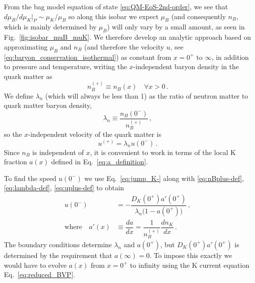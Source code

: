 \documentclass[10pt,superscriptaddress,
amsmath,aps,prc,twocolumn,nofootinbib,floatfix]{revtex4-1}
\newcommand{\Bratio}{\lambda_n}
\begin{document}
From the bag model equation of state \eqref{eq:QM-EoS-2nd-order}, we see that $d\mu_B/d\mu_K|_P\sim \mu_K/\mu_B$ so along this isobar we expect $\mu_B$ (and consequently $n_B$, which is mainly determined by $\mu_B$) will only vary by a small amount, as seen in Fig.~\ref{fig:isobar_muB_muK}. We therefore
develop an analytic approach based on approximating $\mu_B$ and $n_B$ (and therefore the velocity $u$, see \eqref{eq:baryon_conservation_isothermal}) as constant
from $x=0^+$ to $\infty$, in addition to pressure and temperature, writing the $x$-independent baryon density in the quark matter as
\begin{equation}
n_B^{(+)} \equiv n_B(x) \quad \forall x>0 \,.
\label{eq:nBplus-def}
\end{equation}
We
define $\Bratio$ (which will always be less than 1) as the ratio of neutron matter to quark matter baryon density,
\begin{equation}
    \Bratio \equiv \dfrac{n_B(0^-)}{n_B^{(+)}} \,,
    \label{eq:lambda-def}
\end{equation}
so the $x$-independent velocity of the quark matter is
\begin{equation}
u^{(+)} =\Bratio u(0^-)\,.
\label{eq:uplus-def}
\end{equation}
Since $n_B$ is independent of $x$, it is convenient to work in terms of the local K fraction $a(x)$ defined in Eq.~\eqref{eq:a_definition}.

To find the speed $u(0^-)$ we use Eq.~\eqref{eq:jump_K-} along with \eqref{eq:nBplus-def}, \eqref{eq:lambda-def}, \eqref{eq:uplus-def} to obtain
\begin{equation}
\begin{array}{rl}
u(0^-)  &= -\dfrac{D_K(0^+)a'(0^+)}{\Bratio \bigl(1-a(0^+)\bigr)}  \,,\\[3ex]
\text{where}\quad a'(x) &\equiv \dfrac{da}{dx} = \dfrac{1}{n_B^{(+)}} \dfrac{dn_K}{dx} \,.
 \end{array}
\label{eq:interface_gradient}
\end{equation}
The boundary conditions determine $\Bratio$ and $a(0^+)$, but $D_K(0^+)a'(0^+)$ is determined by the requirement that $a(\infty)=0$.
To impose this exactly we would have to evolve $a(x)$ from $x=0^+$ to infinity using the K current equation Eq.~\eqref{eq:reduced_BVP}.
\end{document}
